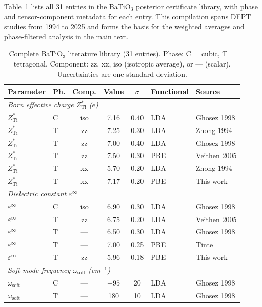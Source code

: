 ﻿\documentclass[prb,onecolumn,superscriptaddress,amsmath,amssymb,longbibliography]{revtex4-2}
\begin{document}
Table~\ref{tab:si_full_library} lists all 31 entries in the BaTiO$_3$
posterior certificate library, with phase and tensor-component metadata
for each entry. This compilation spans DFPT studies from 1994 to 2025 and
forms the basis for the weighted averages and phase-filtered analysis in
the main text.

\begin{table}[ht]
\centering
\footnotesize
\caption{Complete BaTiO$_3$ literature library (31 entries). Phase: C = cubic,
T = tetragonal. Component: zz, xx, iso (isotropic average), or --- (scalar).
Uncertainties are one standard deviation.}
\label{tab:si_full_library}
\begin{tabular}{llcccll}
\toprule
Parameter & Ph. & Comp. & Value & $\sigma$ & Functional & Source \\
\midrule
\multicolumn{7}{l}{\textit{Born effective charge $Z^*_{\mathrm{Ti}}$ ($e$)}} \\
$Z^*_{\mathrm{Ti}}$ & C & iso & 7.16 & 0.40 & LDA & Ghosez 1998 \\
$Z^*_{\mathrm{Ti}}$ & T & zz & 7.25 & 0.30 & LDA & Zhong 1994 \\
$Z^*_{\mathrm{Ti}}$ & T & zz & 7.00 & 0.40 & LDA & Ghosez 1998 \\
$Z^*_{\mathrm{Ti}}$ & T & zz & 7.50 & 0.30 & PBE & Veithen 2005 \\
$Z^*_{\mathrm{Ti}}$ & T & xx & 5.70 & 0.20 & LDA & Zhong 1994 \\
$Z^*_{\mathrm{Ti}}$ & T & xx & 7.17 & 0.20 & PBE & This work \\
\midrule
\multicolumn{7}{l}{\textit{Dielectric constant $\varepsilon^\infty$}} \\
$\varepsilon^\infty$ & C & iso & 6.90 & 0.30 & LDA & Ghosez 1998 \\
$\varepsilon^\infty$ & T & zz & 6.75 & 0.20 & LDA & Veithen 2005 \\
$\varepsilon^\infty$ & T & --- & 6.50 & 0.30 & LDA & Ghosez 1998 \\
$\varepsilon^\infty$ & T & --- & 7.00 & 0.25 & PBE & Tinte \cite{Tinte2003} \\
$\varepsilon^\infty$ & T & zz & 5.96 & 0.18 & PBE & This work \\
\midrule
\multicolumn{7}{l}{\textit{Soft-mode frequency $\omega_{\mathrm{soft}}$ (cm$^{-1}$)}} \\
$\omega_{\mathrm{soft}}$ & C & --- & $-95$ & 20 & LDA & Ghosez 1998 \\
$\omega_{\mathrm{soft}}$ & T & --- & 180 & 10 & LDA & Ghosez 1998 \\

\end{tabular}
\end{table}
\end{document}
